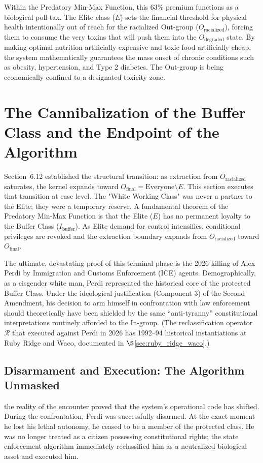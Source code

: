 Within the Predatory Min-Max Function, this 63\% premium functions as a biological poll tax. The Elite class ($E$) sets the financial threshold for physical health intentionally out of reach for the racialized Out-group ($O_{\text{racialized}}$), forcing them to consume the very toxins that will push them into the $O_{\text{degraded}}$ state. By making optimal nutrition artificially expensive and toxic food artificially cheap, the system mathematically guarantees the mass onset of chronic conditions such as obesity, hypertension, and Type 2 diabetes. The Out-group is being economically confined to a designated toxicity zone.

\section{The Cannibalization of the Buffer Class and the Endpoint of the Algorithm}

Section~6.12 established the structural transition: as extraction from $O_{\text{racialized}}$ saturates, the kernel expands toward $O_{\text{final}}=\text{Everyone}\setminus E$. This section executes that transition at case level. The "White Working Class" was never a partner to the Elite; they were a temporary reserve. A fundamental theorem of the Predatory Min-Max Function is that the Elite ($E$) has no permanent loyalty to the Buffer Class ($I_{\text{buffer}}$). As Elite demand for control intensifies, conditional privileges are revoked and the extraction boundary expands from $O_{\text{racialized}}$ toward $O_{\text{final}}$.

The ultimate, devastating proof of this terminal phase is the 2026 killing of Alex Perdi by Immigration and Customs Enforcement (ICE) agents. Demographically, as a cisgender white man, Perdi represented the historical core of the protected Buffer Class. Under the ideological justification (Component 3) of the Second Amendment, his decision to arm himself in confrontation with law enforcement should theoretically have been shielded by the same ``anti-tyranny'' constitutional interpretations routinely afforded to the In-group. (The reclassification operator $\mathcal{R}$ that executed against Perdi in 2026 has 1992--94 historical instantiations at Ruby Ridge and Waco, documented in $\S$\ref{sec:ruby_ridge_waco}.)

\subsection{Disarmament and Execution: The Algorithm Unmasked}
the reality of the encounter proved that the system's operational code has shifted. During the confrontation, Perdi was successfully disarmed. At the exact moment he lost his lethal autonomy, he ceased to be a member of the protected class. He was no longer treated as a citizen possessing constitutional rights; the state enforcement algorithm immediately reclassified him as a neutralized biological asset and executed him.

